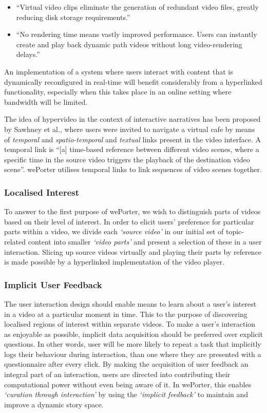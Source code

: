 \begin{itemize}
  \item ``Virtual video clips eliminate the generation of redundant video files, greatly reducing disk storage requirements.''
  \item ``No rendering time means vastly improved performance. Users can instantly create and play back dynamic path videos without long video-rendering delays.''
\end{itemize}

An implementation of a system where users interact with content that is dynamically reconfigured in real-time will benefit considerably from a hyperlinked functionality, especially when this takes place in an online setting where bandwidth will be limited.

The idea of hypervideo in the context of interactive narratives has been proposed by  Sawhney et al., where users were invited to navigate a virtual cafe by means of \emph{temporal} and \emph{spatio-temporal} and \emph{textual} links present in the video interface. A temporal link is  ``[a]	time-based	reference	between different video scenes, where a specific time in the source video triggers the playback of the destination video scene''\cite{Sawhney:1996tk}. wePorter utilises temporal links to link sequences of video scenes together.

\subsubsection{Localised Interest} %
To answer to the first purpose of wePorter, we wish to distinguish parts of videos based on their level of interest. In order to elicit users' preference for particular parts within a video, we divide each \emph{`source video'} in our initial set of topic-related content into smaller \emph{`video parts'} and present a selection of these in a user interaction. Slicing up source videos virtually and playing their parts by reference is made possible by a hyperlinked implementation of the video player.

\subsubsection{Implicit User Feedback}
The user interaction design should enable means to learn about a user's interest in a video at a particular moment in time. This to the purpose of discovering localised regions of interest within separate videos. To make a user's interaction as enjoyable as possible, implicit data acquisition should be preferred over explicit questions. In other words, user will be more likely to repeat a task that implicitly logs their behaviour during interaction, than one where they are presented with a questionnaire after every click. By making the acquisition of user feedback an integral part of an interaction, users are directed into contributing their computational power without even being aware of it. In wePorter, this enables \emph{`curation through interaction'} by using the \emph{`implicit feedback'} to maintain and improve a dynamic story space.

